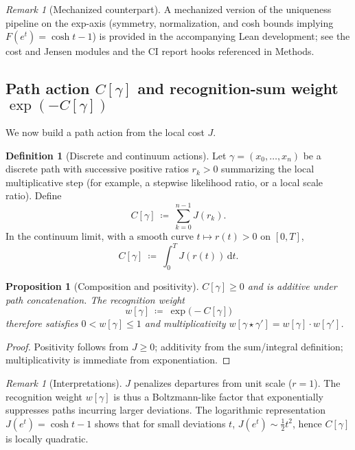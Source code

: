 \documentclass[12pt,a4paper]{article}
\newtheorem{proposition}[theorem]{Proposition}
\theoremstyle{definition}
\newtheorem{definition}[theorem]{Definition}
\theoremstyle{remark}
\newtheorem{remark}[theorem]{Remark}
\begin{document}
\begin{remark}[Mechanized counterpart]
A mechanized version of the uniqueness pipeline on the exp-axis (symmetry, normalization, and cosh bounds implying $F(e^t)=\cosh t-1$) is provided in the accompanying Lean development; see the cost and Jensen modules and the CI report hooks referenced in Methods.
\end{remark}

\subsection{Path action \texorpdfstring{$C[\gamma]$}{C[γ]} and recognition-sum weight \texorpdfstring{$\exp(-C[\gamma])$}{exp(-C[γ])}}
\label{sec:path-action}

We now build a path action from the local cost $J$.

\begin{definition}[Discrete and continuum actions]
Let \(\gamma=(x_0,\dots,x_n)\) be a discrete path with successive positive ratios $r_k>0$ summarizing the local multiplicative step (for example, a stepwise likelihood ratio, or a local scale ratio). Define
\[
  C[\gamma]\ \coloneqq\ \sum_{k=0}^{n-1} J(r_k).
\]
In the continuum limit, with a smooth curve $t\mapsto r(t)>0$ on $[0,T]$,
\[
  C[\gamma]\ \coloneqq\ \int_0^T J(r(t))\,\mathrm{d}t.
\]
\end{definition}

\begin{proposition}[Composition and positivity]
\label{prop:comp-add}
$C[\gamma]\ge 0$ and is additive under path concatenation. The \emph{recognition weight}
\[
  w[\gamma]\ \coloneqq\ \exp\bigl(-C[\gamma]\bigr)
\]
therefore satisfies $0<w[\gamma]\le 1$ and multiplicativity $w[\gamma\!\star\!\gamma']=w[\gamma]\cdot w[\gamma']$.
\end{proposition}

\begin{proof}
Positivity follows from $J\ge 0$; additivity from the sum/integral definition; multiplicativity is immediate from exponentiation.
\end{proof}

\begin{remark}[Interpretations]
$J$ penalizes departures from unit scale ($r=1$). The recognition weight $w[\gamma]$ is thus a Boltzmann-like factor that exponentially suppresses paths incurring larger deviations. The logarithmic representation $J(e^t)=\cosh t-1$ shows that for small deviations $t$, $J(e^t)\sim \tfrac12 t^2$, hence $C[\gamma]$ is locally quadratic.
\end{remark}
\end{document}
